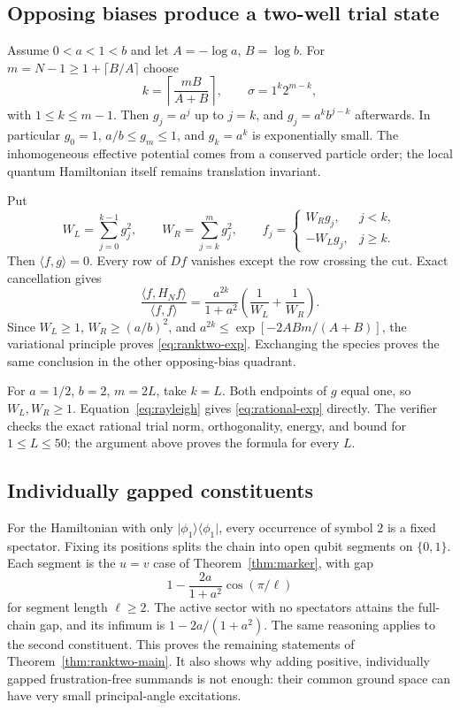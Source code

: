\documentclass[11pt,a4paper]{article}
\theoremstyle{remark}\newtheorem{remark}[theorem]{Remark}
\newcommand{\ket}[1]{\lvert #1\rangle}
\newcommand{\bra}[1]{\langle #1\rvert}
\begin{document}
\subsection{Opposing biases produce a two-well trial state}
Assume $0<a<1<b$ and let $A=-\log a$, $B=\log b$. For $m=N-1\ge1+\lceil B/A\rceil$ choose
\[
 k=\left\lceil\frac{mB}{A+B}\right\rceil,\qquad
 \sigma=1^k2^{m-k},
\]
with $1\le k\le m-1$. Then $g_j=a^j$ up to $j=k$, and
$g_j=a^k b^{j-k}$ afterwards. In particular $g_0=1$, $a/b\le g_m\le1$, and $g_k=a^k$ is exponentially small. The inhomogeneous effective potential comes from a conserved particle order; the local quantum Hamiltonian itself remains translation invariant.

Put
\[
 W_L=\sum_{j=0}^{k-1}g_j^2,\qquad W_R=\sum_{j=k}^{m}g_j^2,
 \qquad
 f_j=\begin{cases}W_Rg_j,&j<k,\\-W_Lg_j,&j\ge k.\end{cases}
\]
Then $\langle f,g\rangle=0$. Every row of $Df$ vanishes except the row crossing the cut. Exact cancellation gives
\begin{equation}\label{eq:rayleigh}
 \frac{\langle f,H_N f\rangle}{\langle f,f\rangle}
 =\frac{a^{2k}}{1+a^2}\left(\frac1{W_L}+\frac1{W_R}\right).
\end{equation}
Since $W_L\ge1$, $W_R\ge(a/b)^2$, and
$a^{2k}\le\exp[-2ABm/(A+B)]$, the variational principle proves \eqref{eq:ranktwo-exp}. Exchanging the species proves the same conclusion in the other opposing-bias quadrant.

For $a=1/2$, $b=2$, $m=2L$, take $k=L$. Both endpoints of $g$ equal one, so $W_L,W_R\ge1$. Equation~\eqref{eq:rayleigh} gives \eqref{eq:rational-exp} directly. The verifier checks the exact rational trial norm, orthogonality, energy, and bound for $1\le L\le50$; the argument above proves the formula for every $L$.

\subsection{Individually gapped constituents}
For the Hamiltonian with only $\ket{\phi_1}\bra{\phi_1}$, every occurrence of symbol $2$ is a fixed spectator. Fixing its positions splits the chain into open qubit segments on $\{0,1\}$. Each segment is the $u=v$ case of Theorem~\ref{thm:marker}, with gap
\[
 1-\frac{2a}{1+a^2}\cos(\pi/\ell)
\]
for segment length $\ell\ge2$. The active sector with no spectators attains the full-chain gap, and its infimum is $1-2a/(1+a^2)$. The same reasoning applies to the second constituent. This proves the remaining statements of Theorem~\ref{thm:ranktwo-main}. It also shows why adding positive, individually gapped frustration-free summands is not enough: their common ground space can have very small principal-angle excitations.
\end{document}
